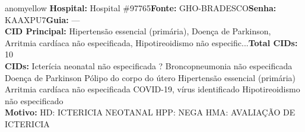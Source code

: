 \documentclass[a4paper,10pt]{article}
\begin{document}
\begin{anomalycard}[Interna\c{c}\~{a}o \#119434 | Pac. \#98119 | MODERADO (z=2.92) | LOS: 3d | 02/03/2026\,$\to$\,05/03/2026]{anomyellow}
\textbf{Hospital:} Hospital \#97765\quad \textbf{Fonte:} GHO-BRADESCO\quad \textbf{Senha:} KAAXPU7\quad \textbf{Guia:} ---\\

\textbf{CID Principal:} {\small Hipertensão essencial (primária), Doença de Parkinson, Arritmia cardíaca não especificada, Hipotireoidismo não especific...}\quad\textbf{Total CIDs:} 10\\

\textbf{CIDs:} {\scriptsize Icterícia neonatal não especificada \textbar{} ? \textbar{} Broncopneumonia não especificada \textbar{} Doença de Parkinson \textbar{} Pólipo do corpo do útero \textbar{} Hipertensão essencial (primária) \textbar{} Arritmia cardíaca não especificada \textbar{} COVID-19, vírus identificado \textbar{} Hipotireoidismo não especificado}\\

\textbf{Motivo:} {\scriptsize HD: ICTERICIA NEOTANAL   HPP: NEGA   HMA: AVALIAÇÃO DE ICTERICIA}\\



\end{anomalycard}
\end{document}
